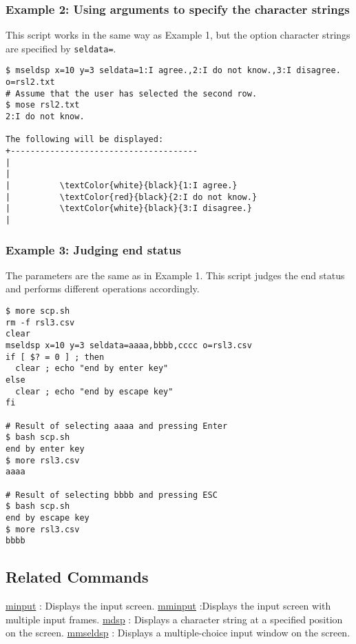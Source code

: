 \subsubsection*{Example 2: Using arguments to specify the character strings}
This script works in the same way as Example 1, but the option character strings are specified by \verb|seldata=|.

\begin{Verbatim}[baselinestretch=0.7,frame=single]
$ mseldsp x=10 y=3 seldata=1:I agree.,2:I do not know.,3:I disagree. o=rsl2.txt
# Assume that the user has selected the second row.
$ mose rsl2.txt
2:I do not know.

The following will be displayed:
+--------------------------------------
|
|
|          \textColor{white}{black}{1:I agree.}
|          \textColor{red}{black}{2:I do not know.}
|          \textColor{white}{black}{3:I disagree.}
|
\end{Verbatim}

\subsubsection*{Example 3: Judging end status}
The parameters are the same as in Example 1. This script judges the end status and performs different operations accordingly.

\begin{Verbatim}[baselinestretch=0.7,frame=single]
$ more scp.sh
rm -f rsl3.csv
clear
mseldsp x=10 y=3 seldata=aaaa,bbbb,cccc o=rsl3.csv
if [ $? = 0 ] ; then
  clear ; echo "end by enter key"
else
  clear ; echo "end by escape key"
fi

# Result of selecting aaaa and pressing Enter
$ bash scp.sh
end by enter key
$ more rsl3.csv
aaaa

# Result of selecting bbbb and pressing ESC
$ bash scp.sh
end by escape key
$ more rsl3.csv
bbbb
\end{Verbatim}

\subsection*{Related Commands}
\hyperref[sect:minput] {minput} : Displays the input screen.
\hyperref[sect:mminput] {mminput} :Displays the input screen with multiple input frames.
\hyperref[sect:mdsp] {mdsp} : Displays a character string at a specified position on the screen.
\hyperref[sect:mmseldsp] {mmseldsp} : Displays a multiple-choice input window on the screen.

%
